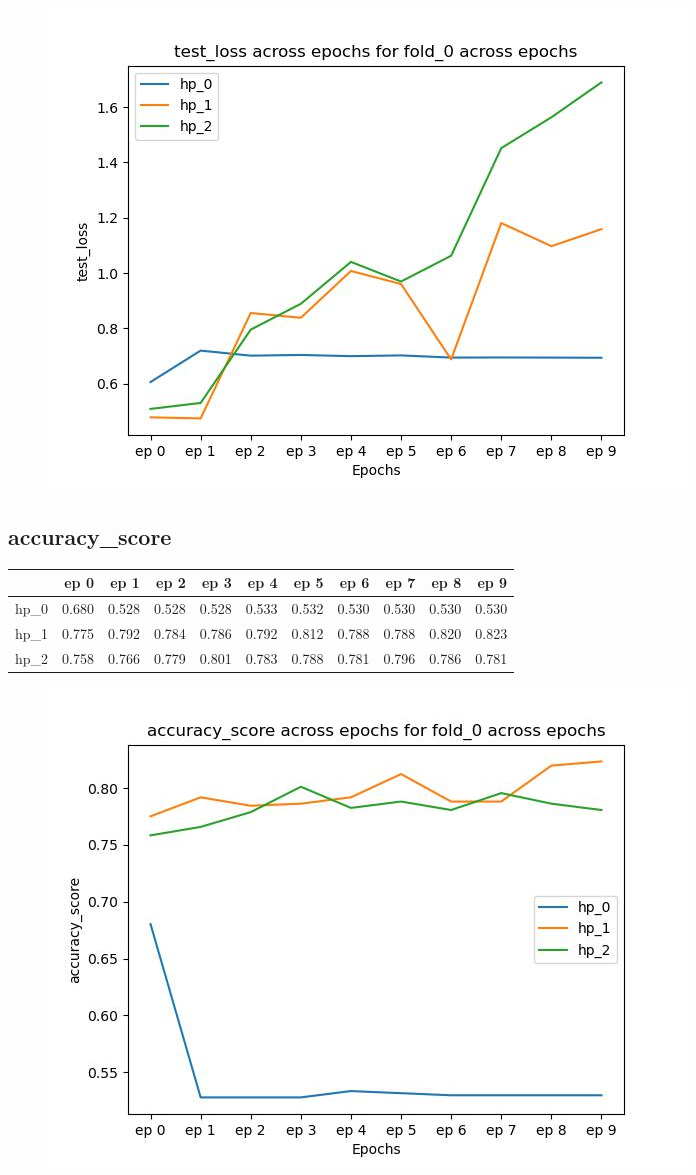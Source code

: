 \documentclass{article}
\begin{document}
\begin{figure}[H]
\includegraphics[scale = 0.75]{fold_0/test_loss}
\end{figure}
\subsection{accuracy\_score}
\begin{tabular}{lrrrrrrrrrr}
\toprule
{} &   ep 0 &   ep 1 &   ep 2 &   ep 3 &   ep 4 &   ep 5 &   ep 6 &   ep 7 &   ep 8 &   ep 9 \\
\midrule
hp\_0 &  0.680 &  0.528 &  0.528 &  0.528 &  0.533 &  0.532 &  0.530 &  0.530 &  0.530 &  0.530 \\
hp\_1 &  0.775 &  0.792 &  0.784 &  0.786 &  0.792 &  0.812 &  0.788 &  0.788 &  0.820 &  0.823 \\
hp\_2 &  0.758 &  0.766 &  0.779 &  0.801 &  0.783 &  0.788 &  0.781 &  0.796 &  0.786 &  0.781 \\
\bottomrule
\end{tabular}

\begin{figure}[H]
\includegraphics[scale = 0.75]{fold_0/accuracy_score}
\end{figure}
\end{document}
